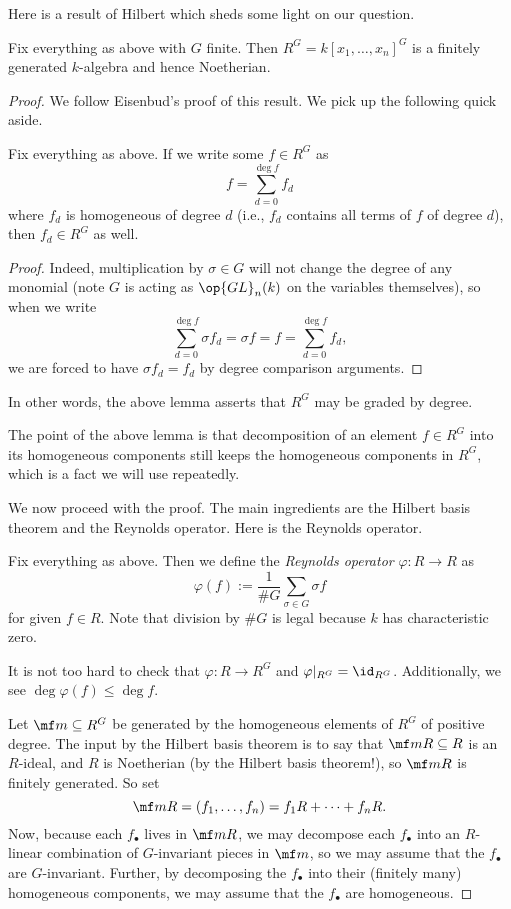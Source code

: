 Here is a result of Hilbert which sheds some light on our question.
\begin{theorem}
	Fix everything as above with $G$ finite. Then $R^G=k[x_1,\ldots,x_n]^G$ is a finitely generated $k$-algebra and hence Noetherian.
\end{theorem}
\begin{proof}
	We follow Eisenbud's proof of this result. We pick up the following quick aside.
	\begin{lemma}
		Fix everything as above. If we write some $f\in R^G$ as
		\[f=\sum_{d=0}^{\deg f}f_d\]
		where $f_d$ is homogeneous of degree $d$ (i.e., $f_d$ contains all terms of $f$ of degree $d$), then $f_d\in R^G$ as well.
	\end{lemma}
	\begin{proof}
		Indeed, multiplication by $\sigma\in G$ will not change the degree of any monomial (note $G$ is acting as $\op{GL}_n(k)$ on the variables themselves), so when we write
		\[\sum_{d=0}^{\deg f}\sigma f_d=\sigma f=f=\sum_{d=0}^{\deg f}f_d,\]
		we are forced to have $\sigma f_d=f_d$ by degree comparison arguments.
	\end{proof}
	\begin{remark}
		In other words, the above lemma asserts that $R^G$ may be graded by degree.
	\end{remark}
	The point of the above lemma is that decomposition of an element $f\in R^G$ into its homogeneous components still keeps the homogeneous components in $R^G$, which is a fact we will use repeatedly.
	
	We now proceed with the proof. The main ingredients are the Hilbert basis theorem and the Reynolds operator. Here is the Reynolds operator.
	\begin{definition}
		Fix everything as above. Then we define the \textit{Reynolds operator} $\varphi:R\to R$ as
		\[\varphi(f):=\frac1{\#G}\sum_{\sigma\in G}\sigma f\]
		for given $f\in R$. Note that division by $\#G$ is legal because $k$ has characteristic zero.
	\end{definition}
	\noindent It is not too hard to check that $\varphi:R\to R^G$ and $\varphi|_{R^G}=\id_{R^G}$. Additionally, we see $\deg\varphi(f)\le\deg f$.

	Let $\mf m\subseteq R^G$ be generated by the homogeneous elements of $R^G$ of positive degree. The input by the Hilbert basis theorem is to say that $\mf mR\subseteq R$ is an $R$-ideal, and $R$ is Noetherian (by the Hilbert basis theorem!), so $\mf mR$ is finitely generated. So set
	\[\mf mR=(f_1,\ldots,f_n)=f_1R+\cdots+f_nR.\]
	Now, because each $f_\bullet$ lives in $\mf mR$, we may decompose each $f_\bullet$ into an $R$-linear combination of $G$-invariant pieces in $\mf m$, so we may assume that the $f_\bullet$ are $G$-invariant. Further, by decomposing the $f_\bullet$ into their (finitely many) homogeneous components, we may assume that the $f_\bullet$ are homogeneous.
	

\end{proof}
